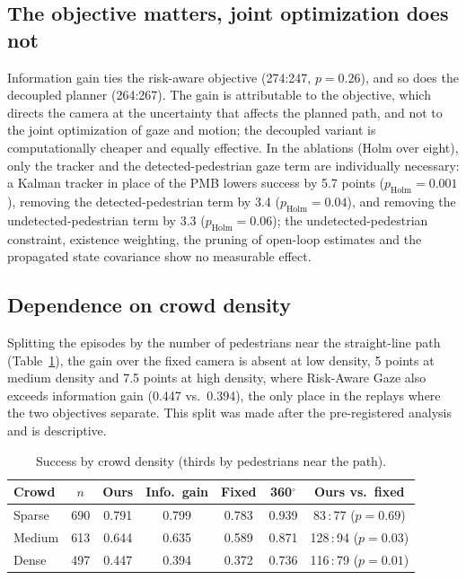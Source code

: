 \documentclass[letterpaper, 10 pt, conference]{ieeeconf}
\begin{document}
\subsection{The objective matters, joint optimization does not}
Information gain ties the risk-aware objective (274:247, $p{=}0.26$), and so does the decoupled planner (264:267). The gain is attributable to the objective, which directs the camera at the uncertainty that affects the planned path, and not to the joint optimization of gaze and motion; the decoupled variant is computationally cheaper and equally effective. In the ablations (Holm over eight), only the tracker and the detected-pedestrian gaze term are individually necessary: a Kalman tracker in place of the PMB lowers success by 5.7 points ($p_\text{Holm}{=}0.001$), removing the detected-pedestrian term by 3.4 ($p_\text{Holm}{=}0.04$), and removing the undetected-pedestrian term by 3.3 ($p_\text{Holm}{=}0.06$); the undetected-pedestrian constraint, existence weighting, the pruning of open-loop estimates and the propagated state covariance show no measurable effect.

\subsection{Dependence on crowd density}
Splitting the episodes by the number of pedestrians near the straight-line path (Table~\ref{tab:density}), the gain over the fixed camera is absent at low density, 5 points at medium density and 7.5 points at high density, where Risk-Aware Gaze also exceeds information gain (0.447 vs.\ 0.394), the only place in the replays where the two objectives separate. This split was made after the pre-registered analysis and is descriptive.

\begin{table}[t]
\centering
\caption{Success by crowd density (thirds by pedestrians near the path).}
\label{tab:density}
\footnotesize
\setlength{\tabcolsep}{3.5pt}
\begin{tabular}{lcccccc}
\toprule
Crowd & $n$ & Ours & Info.\ gain & Fixed & 360$^\circ$ & Ours vs.\ fixed \\
\midrule
Sparse & 690 & 0.791 & 0.799 & 0.783 & 0.939 & 83\,:\,77 ($p{=}0.69$) \\
Medium & 613 & 0.644 & 0.635 & 0.589 & 0.871 & 128\,:\,94 ($p{=}0.03$) \\
Dense  & 497 & 0.447 & 0.394 & 0.372 & 0.736 & 116\,:\,79 ($p{=}0.01$) \\
\bottomrule
\end{tabular}
\end{table}
\end{document}
